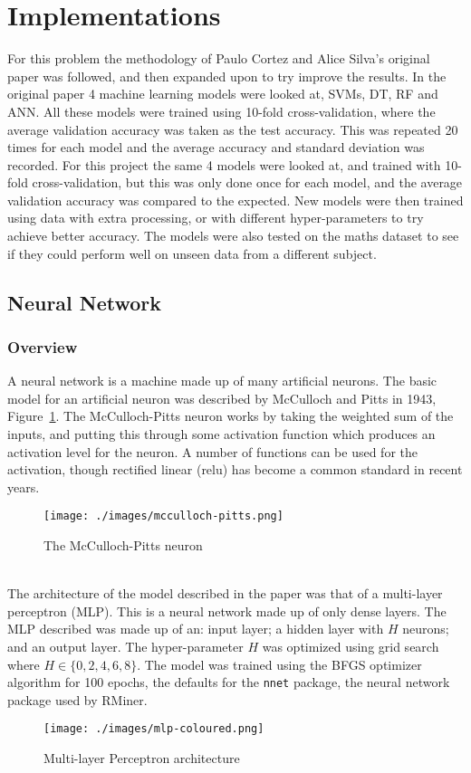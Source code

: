 \documentclass[12pt,a4paper,titlepage,twoside]{report}
\begin{document}
\section{Implementations}
	For this problem the methodology of Paulo Cortez and Alice Silva's original paper was followed, and then expanded upon to try improve the results. In the original paper 4 machine learning models were looked at, SVMs, DT, RF and ANN. All these models were trained using 10-fold cross-validation, where the average validation accuracy was taken as the test accuracy. This was repeated 20 times for each model and the average accuracy and standard deviation was recorded. For this project the same 4 models were looked at, and trained with 10-fold cross-validation, but this was only done once for each model, and the average validation accuracy was compared to the expected. New models were then trained using data with extra processing, or with different hyper-parameters to try achieve better accuracy. The models were also tested on the maths dataset to see if they could perform well on unseen data from a different subject.

\subsection{Neural Network}

\subsubsection*{Overview}
	A neural network is a machine made up of many artificial neurons. The basic model for an artificial neuron was described by McCulloch and Pitts in 1943\cite{mcculloch-pitts-neuron}, Figure~\ref{fig:m-p-neuron}. The McCulloch-Pitts neuron works by taking the weighted sum of the inputs, and putting this through some activation function which produces an activation level for the neuron. A number of functions can be used for the activation, though rectified linear (relu) has become a common standard in recent years\cite{relu-activation}.
	\begin{figure}[h]
  		\centering
  		\texttt{[image: ./images/mcculloch-pitts.png]}
		\caption{The McCulloch-Pitts neuron}
		\label{fig:m-p-neuron}
	\end{figure}\\
	The architecture of the model described in the paper was that of a multi-layer perceptron (MLP). This is a neural network made up of only dense layers\cite{intro-to-nn}. The MLP described was made up of an: input layer; a hidden layer with $H$ neurons; and an output layer. The hyper-parameter $H$ was optimized using grid search where $H \in \{0, 2, 4, 6, 8\}$. The model was trained using the BFGS\cite{bfgs} optimizer algorithm for 100 epochs, the defaults for the \texttt{nnet} package, the neural network package used by RMiner.
	\begin{figure}[h]
		\centering
		\texttt{[image: ./images/mlp-coloured.png]}
		\caption{Multi-layer Perceptron architecture}
		\label{fig:mlp-fig}
	\end{figure}
	
\end{document}
